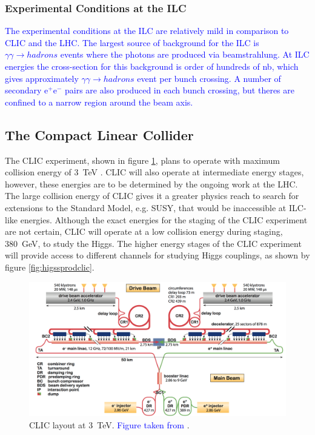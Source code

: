 
\subsubsection{Experimental Conditions at the ILC}
\textcolor{blue}{The experimental conditions at the ILC are relatively mild in comparison to CLIC and the LHC.  The largest source of background for the ILC is $\gamma\gamma \rightarrow hadrons$ events where the photons are produced via beamstrahlung.  At ILC energies the cross-section for this background is order of hundreds of nb, which gives approximately $\gamma\gamma \rightarrow hadrons$ event per bunch crossing.  A number of secondary $\text{e}^{+}\text{e}^{-}$ pairs are also produced in each bunch crossing, but theres are confined to a narrow region around the beam axis.}


\subsection{The Compact Linear Collider}
The CLIC experiment, shown in figure \ref{fig:clic}, plans to operate with maximum collision energy of 3~TeV \cite{Linssen:2012hp, CLIC:2016zwp}.  CLIC will also operate at intermediate energy stages, however, these energies are to be determined by the ongoing work at the LHC.  The large collision energy of CLIC gives it a greater physics reach to search for extensions to the Standard Model, e.g. SUSY, that would be inaccessible at ILC-like energies.  Although the exact energies for the staging of the CLIC experiment are not certain, CLIC will operate at a low collision energy during staging, 380~GeV, to study the Higgs.  The higher energy stages of the CLIC experiment will provide access to different channels for studying Higgs couplings, as shown by figure \ref{fig:higssprodclic}.

\begin{figure}[h!]
\includegraphics[width=1.0\textwidth]{Introduction/Plots/CLIC.png}
\caption[CLIC layout at 3~TeV.  \textcolor{blue}{Figure taken from} \cite{CLIC:2016zwp}.]{CLIC layout at 3~TeV.  \textcolor{blue}{Figure taken from} \cite{CLIC:2016zwp}.}
\label{fig:clic}
\end{figure}

